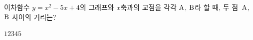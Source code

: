 이차함수 $y=x^2-5x+4$의 그래프와 $x$축과의 교점을 각각 $\mathrm{A}$, $\mathrm{B}$라 할 때, 두 점~$\mathrm{A}$, $\mathrm{B}$ 사이의 거리는?
\begin{choices32}{$1$}{$2$}{$3$}{$4$}{$5$}\end{choices32}
